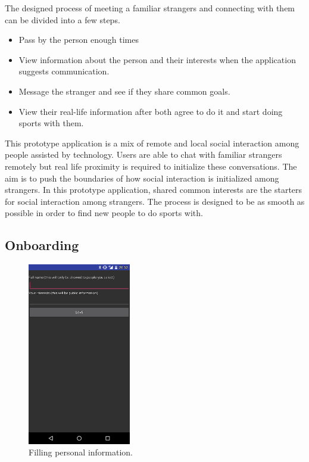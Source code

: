 The designed process of meeting a familiar strangers and connecting with them can be divided into a few steps.

\begin{itemize}
	\item Pass by the person enough times
	\item View information about the person and their interests when the application suggests communication.
	\item Message the stranger and see if they share common goals.
	\item View their real-life information after both agree to do it and start doing sports with them.
\end{itemize}

This prototype application is a mix of remote and local social interaction among people assisted by technology. Users are able to chat with familiar strangers remotely but real life proximity is required to initialize these conversations. The aim is to push the boundaries of how social interaction is initialized among strangers. In this prototype application, shared common interests are the starters for social interaction among strangers. The process is designed to be as smooth as possible in order to find new people to do sports with.

\subsection{Onboarding}

\begin{figure}[htb]
	\begin{center}
		\includegraphics[width=0.4\textwidth]{fs_onboarding.png}
		\caption{Filling personal information.}
	\end{center}
\end{figure}

